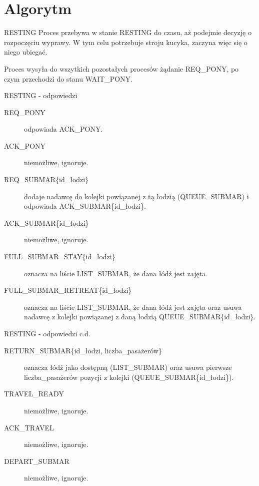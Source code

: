 \documentclass{beamer}
\begin{document}
\section{Algorytm}
\begin{frame}{RESTING}
    \internallinenumbers
    \resetlinenumber[1]
    Proces przebywa w stanie RESTING do czasu, aż podejmie decyzję o rozpoczęciu wyprawy. W tym celu potrzebuje stroju kucyka, zaczyna więc się o niego ubiegać.
    
    \vspace{0.4cm}
    Proces wysyła do wszytkich pozostałych procesów żądanie REQ\_PONY, po czym przechodzi do stanu WAIT\_PONY.
\end{frame}

\begin{frame}{RESTING - odpowiedzi}
    \internallinenumbers
    \resetlinenumber[1]
    \begin{description}
        \item [REQ\_PONY] odpowiada ACK\_PONY.
        \item [ACK\_PONY] niemożliwe, ignoruje.
        \item [REQ\_SUBMAR\{id\_łodzi\}] dodaje nadawcę do kolejki powiązanej z tą łodzią (QUEUE\_SUBMAR) i odpowiada ACK\_SUBMAR\{id\_łodzi\}.
        \item [ACK\_SUBMAR\{id\_łodzi\}] niemożliwe, ignoruje.
        \item [FULL\_SUBMAR\_STAY\{id\_łodzi\}] oznacza na liście LIST\_SUBMAR, że dana łódź jest zajęta.
        \item [FULL\_SUBMAR\_RETREAT\{id\_łodzi\}] oznacza na liście LIST\_SUBMAR, że dana łódź jest zajęta oraz usuwa nadawcę z kolejki powiązanej z daną łodzią QUEUE\_SUBMAR\{id\_łodzi\}.
    \end{description}
\end{frame}

\begin{frame}{RESTING - odpowiedzi c.d.}
    \internallinenumbers
    \begin{description}
        \item [RETURN\_SUBMAR\{id\_łodzi, liczba\_pasażerów\}] oznacza łódź jako dostępną (LIST\_SUBMAR) oraz usuwa pierwsze liczba\_pasażerów pozycji z kolejki (QUEUE\_SUBMAR\{id\_łodzi\}).
        \item [TRAVEL\_READY] niemożliwe, ignoruje.
        \item [ACK\_TRAVEL] niemożliwe, ignoruje.
        \item [DEPART\_SUBMAR] niemożliwe, ignoruje.
    \end{description}
\end{frame}
\end{document}
